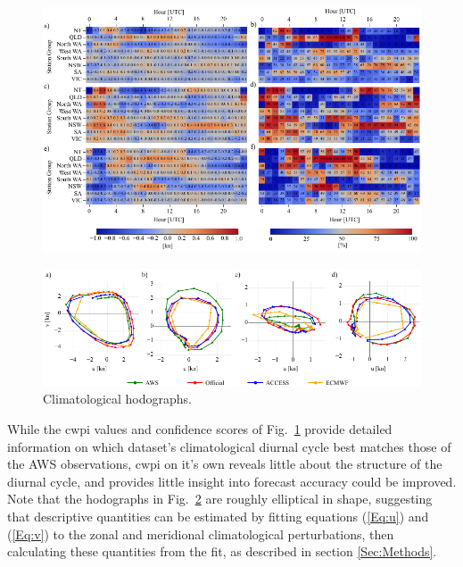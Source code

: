 \documentclass[alpha-refs]{wiley-article}
\begin{document}
\begin{figure}
\centering
\includegraphics{cwpi_coastal.pdf}
\label{Fig:cwpi_coastal}
\end{figure}

\begin{figure}
\centering
\includegraphics{clim_hodo.pdf}
\caption{Climatological hodographs.}
\label{Fig:clim_hodo}
\end{figure}

While the $\text{cwpi}$ values and confidence scores of Fig.~\ref{Fig:cwpi_coastal} provide detailed information on which dataset's climatological diurnal cycle best matches those of the AWS observations, $\text{cwpi}$ on it's own reveals little about the structure of the diurnal cycle, and provides little insight into forecast accuracy could be improved. Note that the hodographs in Fig.~\ref{Fig:clim_hodo} are roughly elliptical in shape, suggesting that descriptive quantities can be estimated by fitting equations (\ref{Eq:u}) and (\ref{Eq:v}) to the zonal and meridional climatological perturbations, then calculating these quantities from the fit, as described in section \ref{Sec:Methods}. 
\end{document}
